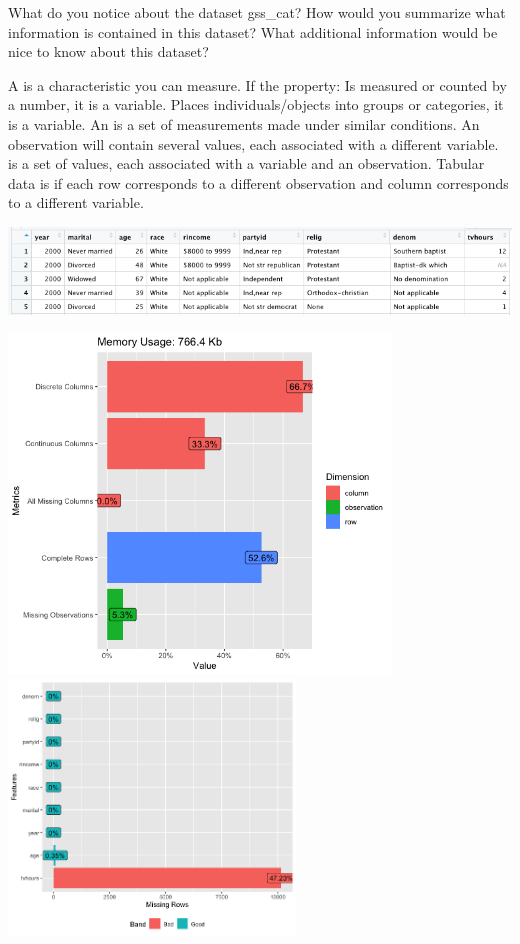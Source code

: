 \bb
\ii What do you notice about the dataset gss\_cat? How would you summarize what information is contained in this dataset? \vfill
\ii What additional information would be nice to know about this dataset? \vfill
\ee


\clearpage


\bbox
\bi
\ii A \textbf{} is a characteristic you can measure. If the property:
\bi
\ii Is measured or counted by a number, it is a \textbf{} variable.
\ii Places individuals/objects into groups or categories, it is a \textbf{} variable.
\ei
\ii An \textbf{} is a set of measurements made under similar conditions. An observation will contain several values, each associated with a different variable.
\ii \textbf{} is a set of values, each associated with a variable and an observation.
\bi
\ii Tabular data is \textbf{} if each row corresponds to a different observation and column corresponds to a different variable.
\ei
\ei
\ebox

\begin{center}
\includegraphics[width=7in]{01/fig-view.png}
\end{center}

\includegraphics[width=4in]{01/fig-plot-intro.png} \ \ \ \ \ \ 
\includegraphics[width=3in]{01/fig-plot-missing.png}

